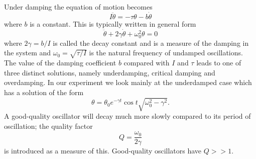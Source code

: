 \documentclass[12pt]{article}
\begin{document}
Under damping the equation of motion becomes
\begin{equation}
I\ddot{\theta}=-\tau\theta-b\dot{\theta}
\end{equation}
where $b$ is a constant. This is typically written in general form
\begin{equation}
\ddot{\theta}+2\gamma\dot{\theta}+\omega_0^2\theta=0
\end{equation}
where $2\gamma=b/I$ is called the decay constant and is a measure of the damping in the system and $\omega_0=\sqrt{\tau/I}$ is the natural frequency of undamped oscillations. The value of the damping coefficient $b$ compared with $I$ and $\tau$ leads to one of three distinct solutions, namely underdamping, critical damping and overdamping. In our experiment we look mainly at the underdamped case which has a solution of the form
\begin{equation}
\theta=\theta_0e^{-\gamma t}\cos{t\sqrt{\omega_0^2-\gamma^2}}.
\label{underdampedSolution}
\end{equation}
A good-quality oscillator will decay much more slowly compared to its period of oscillation; the quality factor
\begin{equation}
Q=\frac{\omega_0}{2\gamma}
\label{qualityFactor}
\end{equation}
is introduced as a measure of this. Good-quality oscillators have $Q>>1$.
\end{document}
